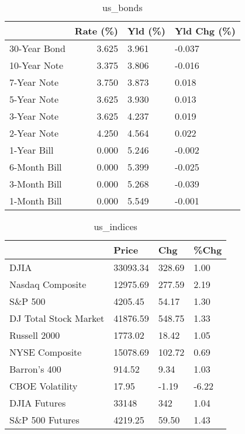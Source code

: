 \documentclass{article}%
\begin{document}
%


\begin{table}[htbp]%
\caption{us\_bonds}%
\centering%
\begin{adjustbox}{width=1\textwidth}%
\begin{tabular}{lrll}
\toprule
             &  Rate (\%) & Yld (\%) & Yld Chg (\%) \\
\midrule
30-Year Bond &     3.625 &   3.961 &      -0.037 \\
10-Year Note &     3.375 &   3.806 &      -0.016 \\
 7-Year Note &     3.750 &   3.873 &       0.018 \\
 5-Year Note &     3.625 &   3.930 &       0.013 \\
 3-Year Note &     3.625 &   4.237 &       0.019 \\
 2-Year Note &     4.250 &   4.564 &       0.022 \\
 1-Year Bill &     0.000 &   5.246 &      -0.002 \\
6-Month Bill &     0.000 &   5.399 &      -0.025 \\
3-Month Bill &     0.000 &   5.268 &      -0.039 \\
1-Month Bill &     0.000 &   5.549 &      -0.001 \\
\bottomrule
\end{tabular}
%
\end{adjustbox}%
\end{table}

%


\begin{table}[htbp]%
\caption{us\_indices}%
\centering%
\begin{adjustbox}{width=1\textwidth}%
\begin{tabular}{llll}
\toprule
                      &    Price &    Chg &  \%Chg \\
\midrule
                 DJIA & 33093.34 & 328.69 &  1.00 \\
     Nasdaq Composite & 12975.69 & 277.59 &  2.19 \\
              S\&P 500 &  4205.45 &  54.17 &  1.30 \\
DJ Total Stock Market & 41876.59 & 548.75 &  1.33 \\
         Russell 2000 &  1773.02 &  18.42 &  1.05 \\
       NYSE Composite & 15078.69 & 102.72 &  0.69 \\
         Barron's 400 &   914.52 &   9.34 &  1.03 \\
      CBOE Volatility &    17.95 &  -1.19 & -6.22 \\
         DJIA Futures &    33148 &    342 &  1.04 \\
      S\&P 500 Futures &  4219.25 &  59.50 &  1.43 \\
\bottomrule
\end{tabular}
%
\end{adjustbox}%
\end{table}
\end{document}
